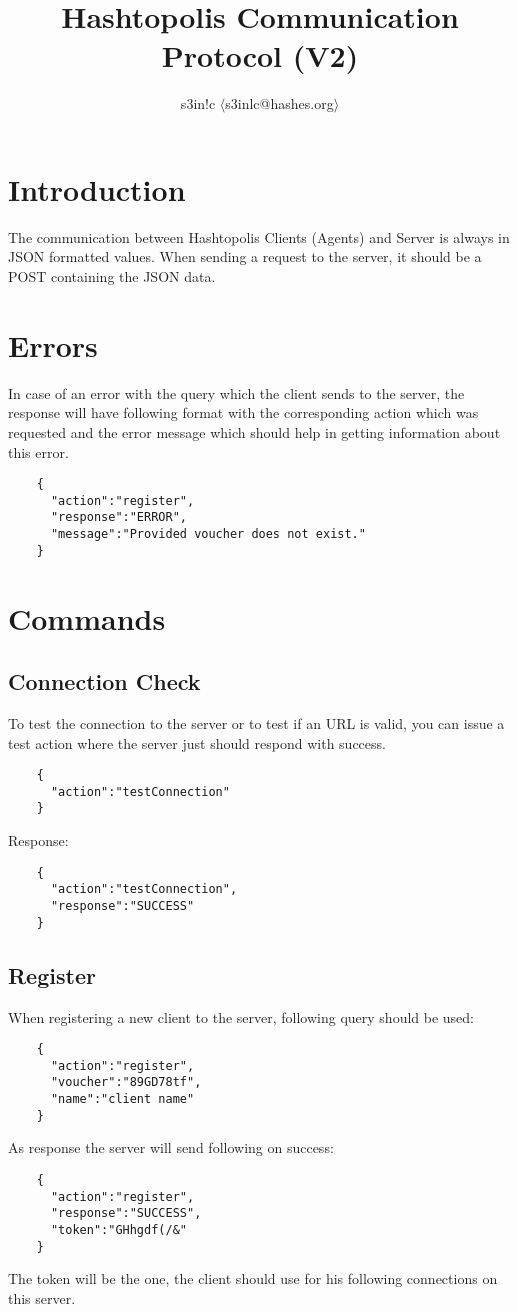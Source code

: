 \documentclass{article}
\author{s3in!c $\langle$s3inlc@hashes.org$\rangle$ }
\begin{document}
	\title{Hashtopolis Communication Protocol (V2)}
	\maketitle
	\section*{Introduction}
	The communication between Hashtopolis Clients (Agents) and Server is always in JSON formatted values. When sending a request to the server, it should be a POST containing the JSON data.

	\section*{Errors}
	In case of an error with the query which the client sends to the server, the response will have following format with the corresponding action which was requested and the error message which should help in getting information about this error.
	\begin{verbatim}
	{
	  "action":"register",
	  "response":"ERROR",
	  "message":"Provided voucher does not exist."
	}
	\end{verbatim}
	\pagebreak
	\section*{Commands}
	
	\subsection*{Connection Check}
	To test the connection to the server or to test if an URL is valid, you can issue a test action where the server just should respond with success.
	\begin{verbatim}
	{
	  "action":"testConnection"
	}
	\end{verbatim}
	Response:
	\begin{verbatim}
	{
	  "action":"testConnection",
	  "response":"SUCCESS"
	} 
	\end{verbatim}

	\subsection*{Register}
	When registering a new client to the server, following query should be used:
	\begin{verbatim}
	{
	  "action":"register",
	  "voucher":"89GD78tf",
	  "name":"client name"
	}
	\end{verbatim}
	As response the server will send following on success:
	\begin{verbatim}
	{
	  "action":"register",
	  "response":"SUCCESS",
	  "token":"GHhgdf(/&"
	} 
	\end{verbatim}
	The token will be the one, the client should use for his following connections on this server.
	
\end{document}

